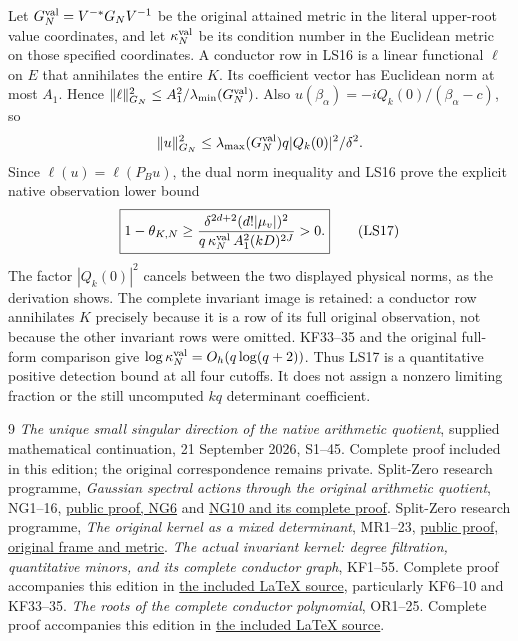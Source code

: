 \documentclass[11pt]{article}
\begin{document}
Let $G_N^{\rm val}=V^{-*}G_NV^{-1}$ be the original attained
metric in the literal upper-root value coordinates, and let
$\kappa_N^{\rm val}$ be its condition number in the Euclidean
metric on those specified coordinates. A conductor row in LS16
is a linear functional $\ell$ on $E$ that annihilates the entire
$K$. Its coefficient vector has Euclidean norm at most $A_1$.
Hence $\lVert\ell\rVert_{G_N}^2\le A_1^2/\lambda_{\min}(G_N^{\rm val})$.
Also $u(\beta_\alpha)=-iQ_k(0)/(\beta_\alpha-c)$, so
\[
\lVert u\rVert_{G_N}^2
\le\lambda_{\max}(G_N^{\rm val})q|Q_k(0)|^2/\delta^2.
\]
Since $\ell(u)=\ell(P_Bu)$, the dual norm inequality and LS16
prove the explicit native observation lower bound
\[
\boxed{1-\theta_{K,N}
\ge
\frac{\delta^{2d+2}(d!|\mu_v|)^2}
 {q\,\kappa_N^{\rm val}\,A_1^2(kD)^{2J}}>0.}
\tag{LS17}
\]
The factor $|Q_k(0)|^2$ cancels between the two displayed
physical norms, as the derivation shows. The complete invariant
image is retained: a conductor row annihilates $K$ precisely
because it is a row of its full original observation, not because
the other invariant rows were omitted.
KF33--35 and the original full-form comparison give
$\log\kappa_N^{\rm val}=O_h(q\log(q+2))$.
Thus LS17 is a quantitative positive detection bound at all
four cutoffs. It does not assign a nonzero limiting fraction
or the still uncomputed $kq$ determinant coefficient.

\begin{thebibliography}{9}
 \emph{The unique small singular direction of the
native arithmetic quotient}, supplied mathematical continuation,
21 September 2026, S1--45. Complete proof included in this edition;
the original correspondence remains private.
 Split-Zero research programme,
\emph{Gaussian spectral actions through the original arithmetic
quotient}, NG1--16,
\href{https://github.com/KokunoYumeto/zeta-function-research-reader/blob/5992ad50c0f2a06921f1fcaded7b4e38097c0739/workbenches/splitzero-tandem/continuations/20260920-original-kernel-mixed-determinants/providers/NATIVE_GAUSSIAN_TRANSFER.tex#L101}{public proof, NG6}
and
\href{https://github.com/KokunoYumeto/zeta-function-research-reader/blob/5992ad50c0f2a06921f1fcaded7b4e38097c0739/workbenches/splitzero-tandem/continuations/20260920-original-kernel-mixed-determinants/providers/NATIVE_GAUSSIAN_TRANSFER.tex#L207}{NG10 and its complete proof}.
 Split-Zero research programme,
\emph{The original kernel as a mixed determinant}, MR1--23,
\href{https://github.com/KokunoYumeto/zeta-function-research-reader/blob/5992ad50c0f2a06921f1fcaded7b4e38097c0739/workbenches/splitzero-tandem/continuations/20260920-original-kernel-mixed-determinants/ORIGINAL_KERNEL_MIXED_DETERMINANT.tex#L36}{public proof, original frame and metric}.
 \emph{The actual invariant kernel: degree filtration,
quantitative minors, and its complete conductor graph}, KF1--55.
Complete proof accompanies this edition in
\href{ACTUAL_KERNEL_FILTRATION_AND_GRAPH.tex}{the included LaTeX source},
particularly KF6--10 and KF33--35.
 \emph{The roots of the complete conductor polynomial},
OR1--25. Complete proof accompanies this edition in
\href{COMPLETE_CONDUCTOR_ROOT_GEOMETRY.tex}{the included LaTeX source}.
\end{thebibliography}
\end{document}
